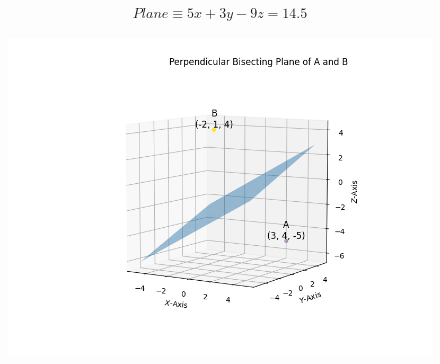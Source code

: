 \documentclass[journal]{IEEEtran}
\begin{document}
	\begin{align}
		Plane \equiv 5x + 3y - 9z = 14.5
	\end{align}    
    

    \begin{figure}[h]
        \centering
       \includegraphics[width=0.7\linewidth]{figs/fig1.png}
       \caption{}
       \label{graph}
    \end{figure}
\end{document}

